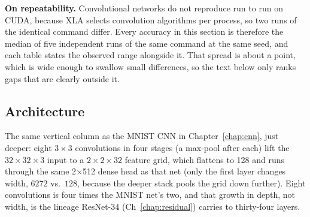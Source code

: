 \medskip\noindent\textbf{On repeatability.} Convolutional networks do not
reproduce run to run on CUDA, because XLA selects convolution algorithms
per process, so two runs of the identical command differ. Every accuracy
in this section is therefore the median of five independent runs
of the same command at the same seed, and each
table states the observed range alongside it. That spread is about a
point, which is wide enough to swallow small differences, so the text
below only ranks gaps that are clearly outside it.

\subsection*{Architecture}

The same vertical column as the MNIST CNN in
Chapter~\ref{chap:cnn}, just deeper: eight $3 \times 3$ convolutions
in four stages (a max-pool after each) lift the $32 \times 32 \times 3$
input to a $2 \times 2 \times 32$ feature grid, which flattens to 128
and runs through the same 2$\times$512 dense head as that net
(only the first layer changes width, $6272$ vs.\ $128$, because the
deeper stack pools the grid down further). Eight convolutions is four
times the MNIST net's two, and that growth in depth, not width, is
the lineage ResNet-34 (Ch~\ref{chap:residual}) carries to thirty-four
layers.

